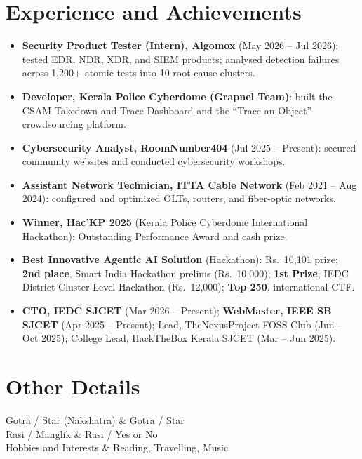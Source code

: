 \documentclass[10.5pt, a4paper]{article}
\makeatletter
\newif\ifmatrimonial
\newenvironment{details}{%
  \par\noindent
  \tabularx{\textwidth}{@{}>{\bfseries\raggedright\arraybackslash}p{4.6cm}@{\hspace{3pt}:\hspace{8pt}}X@{}}
}{%
  \endtabularx\par
}
\newcommand{\field}[2]{#1 & #2 \\[1.5pt]}
\makeatother
\begin{document}
\section{Experience and Achievements}
\begin{itemize}[leftmargin=14pt, itemsep=2pt, topsep=3pt]
  \item \textbf{Security Product Tester (Intern), Algomox} (May 2026 -- Jul 2026): tested EDR, NDR, XDR, and SIEM products; analysed detection failures across 1,200+ atomic tests into 10 root-cause clusters.
  \item \textbf{Developer, Kerala Police Cyberdome (Grapnel Team)}: built the CSAM Takedown and Trace Dashboard and the ``Trace an Object'' crowdsourcing platform.
  \item \textbf{Cybersecurity Analyst, RoomNumber404} (Jul 2025 -- Present): secured community websites and conducted cybersecurity workshops.
  \item \textbf{Assistant Network Technician, ITTA Cable Network} (Feb 2021 -- Aug 2024): configured and optimized OLTs, routers, and fiber-optic networks.
  \item \textbf{Winner, Hac'KP 2025} (Kerala Police Cyberdome International Hackathon): Outstanding Performance Award and cash prize.
  \item \textbf{Best Innovative Agentic AI Solution} (Hackathon): Rs.\ 10,101 prize; \textbf{2nd place}, Smart India Hackathon prelims (Rs.\ 10,000); \textbf{1st Prize}, IEDC District Cluster Level Hackathon (Rs.\ 12,000); \textbf{Top 250}, international CTF.
  \item \textbf{CTO, IEDC SJCET} (Mar 2026 -- Present); \textbf{WebMaster, IEEE SB SJCET} (Apr 2025 -- Present); Lead, TheNexusProject FOSS Club (Jun -- Oct 2025); College Lead, HackTheBox Kerala SJCET (Mar -- Jun 2025).
\end{itemize}
\fi

\ifmatrimonial
\section{Other Details}
\begin{details}
  \field{Gotra / Star (Nakshatra)}{Gotra / Star}
  \field{Rasi / Manglik}{Rasi / Yes or No}
  \field{Hobbies and Interests}{Reading, Travelling, Music}
\end{details}
\end{document}
